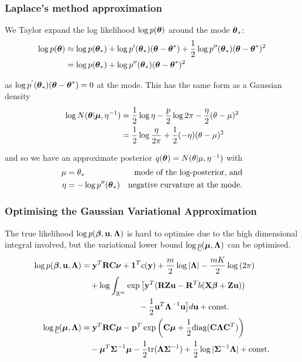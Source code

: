 \documentclass{beamer}
\begin{document}
\begin{frame}
\frametitle{Laplace's method approximation}
We Taylor expand the log likelihood $\log{p({\boldsymbol\theta})}$ around the mode
${\boldsymbol \theta}_*$:
\begin{align*}
\log{p({\boldsymbol\theta})} &\approx \log{p({\boldsymbol\theta}_*)} + \log{p'({\boldsymbol\theta}_*)}({\boldsymbol \theta} - {\boldsymbol \theta}^*) + {\frac{1}{2}} \log{p''({\boldsymbol\theta}_*)}({\boldsymbol \theta} - {\boldsymbol \theta}^*)^2 \\
&= \log{p({\boldsymbol\theta}_*)} + \log{p''({\boldsymbol\theta}_*)}({\boldsymbol \theta} - {\boldsymbol \theta}^*)^2
\end{align*}

as $\log{p^{'}({\boldsymbol\theta}_*)}({\boldsymbol \theta} - {\boldsymbol \theta}^*) = 0$ at the mode. This has
the same form as a Gaussian density
\begin{align*}
\log{N({\boldsymbol\theta}|{\boldsymbol\mu}, \eta^{-1})} &= {\frac{1}{2}} \log{\eta} - \frac{p}{2} \log{2 \pi} - \frac{\eta}{2} (\theta-\mu)^2 \\
&= {\frac{1}{2}} \log{\frac{\eta}{2\pi}} + {\frac{1}{2}} (-\eta)(\theta - \mu)^2
\end{align*}

and so we have an approximate posterior $q({\boldsymbol \theta}) = N(\theta|\mu, \eta^{-1})$ with
\begin{align*}
\mu &= \theta_* & \text{mode of the log-posterior, and}\\
\eta &= -\log{p''({\boldsymbol\theta}_*)} & \text{negative curvature at the mode.} \\
\end{align*}
\end{frame}

\begin{frame}
\frametitle{Optimising the Gaussian Variational Approximation}
The true likelihood $\log p({\boldsymbol \beta}, {\bf u}, {\boldsymbol \Lambda})$ is hard to optimise due 
to the high dimensional integral involved, but the variational lower bound $\log \underline{p}({\boldsymbol \mu}, {\boldsymbol \Lambda})$ can be optimised.
\begin{align*}
\log p({\boldsymbol \beta}, {\bf u}, {\boldsymbol \Lambda}) &= {\bf y}^T {\bf R} {\bf C} {\boldsymbol \nu} + {\bf 1}^T c({\bf y}) + \frac{m}{2} \log |{\boldsymbol \Lambda}| - \frac{mK}{2} \log{(2 \pi)}\\
&\quad + \log  \int_{\mathbb{R}^{m}} \exp \big[ {\bf y}^T ({\bf R} {\bf Z} {\bf u} - {\bf R}^T b( {\bf X} {\boldsymbol \beta} + {\bf Z} {\bf u})) \\
 &\quad \quad \quad \quad \quad \quad \quad - {\frac{1}{2}} {{\bf u}^T {\boldsymbol \Lambda}^{-1} {\bf u} } \big] d {\bf u} + \text{const.}\\
\log \underline{p}({\boldsymbol \mu}, {\boldsymbol \Lambda}) &= {\bf y}^T {\bf R} {\bf C} {\boldsymbol \mu} - {\bf p}^T \exp{\left({\bf C}{\boldsymbol\mu}+ {\frac{1}{2}}\text{diag}{({\bf C}{\boldsymbol\Lambda}{\bf C}^T)}\right)} \\
& \quad - {\boldsymbol \mu}^T {\boldsymbol \Sigma}^{-1} {\boldsymbol \mu} - {\frac{1}{2}} \text{tr}{({\boldsymbol\Lambda}{\boldsymbol\Sigma}^{-1})} + {\frac{1}{2}} \log{|{\boldsymbol\Sigma}^{-1}{\boldsymbol\Lambda}|} + \text{const.} \\
\end{align*}
\end{frame}
\end{document}
